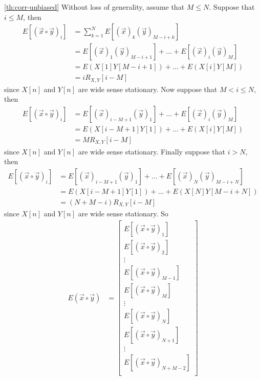 \documentclass[a4paper, openany, oneside]{memoir}
\begin{document}
\begin{blockProofTheorem}{\ref{th:corr-unbiased}}
    Without loss of generality, assume that $M \le N$. Suppose that $i \le M$, then
    \begin{align*}
        E[(\vec{x} \circ \vec{y})_i] &= \sum_{k=1}^N E[(\vec{x})_k (\vec{y})_{M-i+k}] \\
        &= E[(\vec{x})_1 (\vec{y})_{M-i+1}] + \ldots + E[(\vec{x})_i (\vec{y})_{M}] \\
        &= E(X[1] Y[M-i+1]) + \ldots + E(X[i] Y[M])  \\
        &= i R_{X,Y}[i-M]
    \end{align*}
    since $X[n]$ and $Y[n]$ are wide sense stationary. Now suppose that $M < i \le N$, then
    \begin{align*}
        E[(\vec{x} \circ \vec{y})_i] &= E[(\vec{x})_{i-M+1} (\vec{y})_{1}] + \ldots + E[(\vec{x})_i (\vec{y})_{M}] \\
        &= E(X[i-M+1] Y[1]) + \ldots + E(X[i] Y[M]) \\  
        &= M R_{X,Y}[i-M]
    \end{align*}
    since $X[n]$ and $Y[n]$ are wide sense stationary. Finally suppose that $i > N$, then
    \begin{align*}
        E[(\vec{x} \circ \vec{y})_i] &= E[(\vec{x})_{i-M+1} (\vec{y})_{1}] + \ldots + E[(\vec{x})_N (\vec{y})_{M-i+N}] \\
        &= E(X[i-M+1] Y[1]) + \ldots + E(X[N] Y[M-i+N]) \\
        &= (N+M-i) R_{X,Y}[i-M]
    \end{align*}
    since $X[n]$ and $Y[n]$ are wide sense stationary. So
    \begin{align*}
        E(\vec{x} \circ \vec{y}) &= \begin{bmatrix}
            E[(\vec{x} \circ \vec{y})_1] \\
            E[(\vec{x} \circ \vec{y})_2] \\
            \vdots \\
            E[(\vec{x} \circ \vec{y})_{M-1}] \\
            E[(\vec{x} \circ \vec{y})_{M}] \\
            \vdots \\
            E[(\vec{x} \circ \vec{y})_N] \\
            E[(\vec{x} \circ \vec{y})_{N+1}] \\
            \vdots \\
            E[(\vec{x} \circ \vec{y})_{N+M-2}] \\

\end{bmatrix}
\end{align*}
\end{blockProofTheorem}
\end{document}
